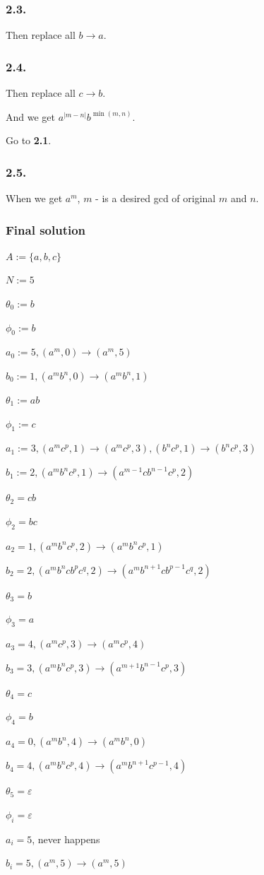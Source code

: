 \documentclass{article}
\begin{document}
\subsubsection*{2.3.}

Then replace all $b \to a$.

\subsubsection*{2.4.}

Then replace all $c \to b$.

And we get $a^{|m-n|}b^{\min(m,n)}$.

Go to \textbf{2.1}.

\subsubsection*{2.5.}

When we get $a^m$, $m$ - is a desired gcd of original $m$ and $n$.

\subsubsection*{Final solution}

$A := \{ a, b, c \}$

$N := 5$

$\theta_0 := b$

$\phi_0 := b$

$a_0 := 5, (a^m, 0) \to (a^m, 5)$

$b_0 := 1, (a^mb^n, 0) \to (a^mb^n, 1)$

$\theta_1 := ab$

$\phi_1 := c$

$a_1 := 3, (a^mc^p, 1) \to (a^mc^p, 3), (b^nc^p, 1) \to (b^nc^p, 3)$

$b_1 := 2, (a^mb^nc^p, 1) \to (a^{m-1}cb^{n-1}c^p, 2)$

$\theta_2 = cb$

$\phi_2 = bc$

$a_2 = 1, (a^mb^nc^p, 2) \to (a^mb^nc^p, 1)$

$b_2 = 2, (a^mb^ncb^pc^q, 2) \to (a^mb^{n+1}cb^{p-1}c^q, 2)$

$\theta_3 = b$

$\phi_3 = a$

$a_3 = 4, (a^mc^p, 3) \to (a^mc^p, 4)$

$b_3 = 3, (a^mb^nc^p, 3) \to (a^{m + 1}b^{n-1}c^p, 3)$

$\theta_4 = c$

$\phi_4 = b$

$a_4 = 0, (a^mb^n, 4) \to (a^mb^n, 0)$

$b_4 = 4, (a^mb^nc^p, 4) \to (a^mb^{n+1}c^{p-1}, 4)$

$\theta_5 = \varepsilon$

$\phi_i = \varepsilon$

$a_i = 5$, never happens

$b_i = 5, (a^m, 5) \to (a^m, 5)$
\end{document}
